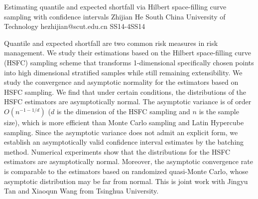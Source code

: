 \begin{talk}
  {Estimating quantile and expected shortfall via Hilbert space-filling curve sampling with confidence intervals}%
  {Zhijian He}%
  {South China University of Technology}%
  {hezhijian@scut.edu.cn}%
  {}%
{}{}{SS14-4}{SS14}


Quantile and expected shortfall  are two common risk measures in risk management. We study their estimations based on the Hilbert space-filling curve (HSFC) sampling scheme that transforms 1-dimensional specifically chosen points into high dimensional stratified samples while still remaining extensibility. We study the convergence and asymptotic normality for the estimators based on HSFC sampling. We find that under certain conditions, the distributions of the HSFC estimators are asymptotically normal. The asymptotic variance is of order $O(n^{-1-1/d})$ ($d$ is the dimension of the HSFC sampling and $n$ is the sample size), which is more efficient than Monte Carlo sampling and Latin Hypercube sampling. Since the asymptotic variance does not admit an explicit form, we establish an asymptotically valid confidence interval estimates by the batching method.  Numerical experiments show that the distributions for the HSFC estimators are asymptotically normal. Moreover, the asymptotic convergence rate is comparable to the estimators based on randomized quasi-Monte Carlo, whose asymptotic distribution may be far from normal. This is joint work with Jingyu Tan and Xiaoqun Wang from Tsinghua University.
\end{talk}

